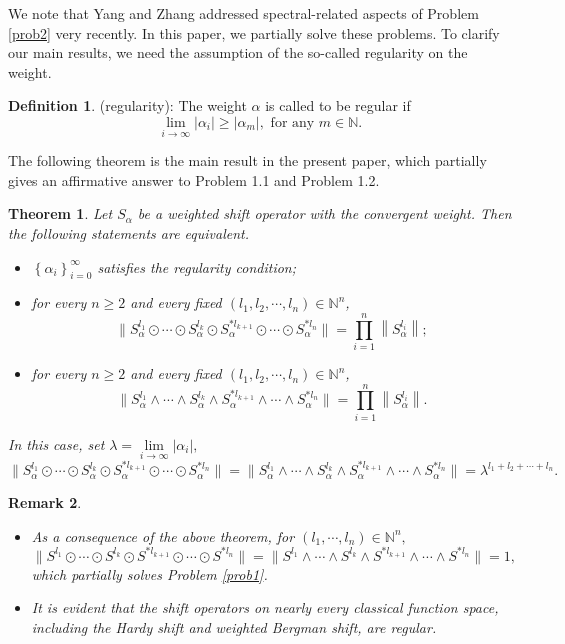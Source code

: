 \documentclass[11pt]{article}
\theoremstyle{plain}
\newtheorem{thm}{Theorem}[section]
\newtheorem{rem}[thm]{Remark}
\theoremstyle{definition}
\newtheorem{defn}{Definition}[section]
\begin{document}
We note that Yang and Zhang \cite{YZ} addressed spectral-related aspects of
Problem \ref{prob2} very recently. In this paper, we partially solve these problems. To clarify our main results, we need the assumption of the so-called regularity on the weight.

\begin{defn}\label{def:regularity}
(regularity): The weight $\alpha$ is called to be regular if 
 $$\lim\limits_{i \to \infty } \left | \alpha_{i}  \right | \ge \left | \alpha_{m}  \right |, \text{ for any } m \in \mathbb{N}. $$ 
\end{defn}
The following theorem is the main result in the present paper, which partially gives an affirmative answer to Problem 1.1 and Problem 1.2.
\begin{thm}\label{thm1.1}
 Let $S_\alpha$ be a weighted shift operator with the convergent weight. Then
 the following statements are equivalent.
\begin{itemize}
     \item[(1)] $\left \{ \alpha _{i}  \right \} _{i=0}^{\infty }$ satisfies the regularity condition;
     \item[(2)]
 for every $ n \ge 2$ and every fixed $\left ( l_{1},  l_{2},\cdots,l_{n} \right )\in \mathbb{N}^{n}$,
	$$\|S_{\alpha}^{l_1}\odot\cdots \odot S_{\alpha}^{l_k}\odot S_{\alpha}^{*l_{k+1}}\odot\cdots \odot S_{\alpha}^{*l_{n}}\|  =\mathop{\prod}_{i=1}^n\left \| S_{\alpha}^{{l_{i}}}\right\|;$$
     \item[(3)]for every $ n \ge 2$ and every fixed $\left ( l_{1},  l_{2},\cdots,l_{n} \right )\in \mathbb{N}^{n}$,
	$$\|S_{\alpha}^{l_1}\wedge\cdots \wedge S_{\alpha}^{l_k}\wedge S_{\alpha}^{*l_{k+1}}\wedge\cdots \wedge S_{\alpha}^{*l_{n}}\|=\mathop{\prod}_{i=1}^n\left \| S_{\alpha}^{{l_{i}}}\right\|.$$
\end{itemize}
In this case, set $\lambda =\lim\limits_{i \to \infty}\left | \alpha_{i}  \right |,$ $$\|S_{\alpha}^{l_1}\odot\cdots \odot S_{\alpha}^{l_k}\odot S_{\alpha}^{*l_{k+1}}\odot\cdots \odot S_{\alpha}^{*l_{n}}\|=\|S_{\alpha}^{l_1}\wedge\cdots \wedge S_{\alpha}^{l_k}\wedge S_{\alpha}^{*l_{k+1}}\wedge\cdots \wedge S_{\alpha}^{*l_{n}}\|=\lambda ^{  l_{1}  +  l_{2}  + \cdots + l_{n} }.$$
\end{thm}
\begin{rem}
\begin{itemize}
\item[1.] As a consequence of the above theorem, for $(l_1,\cdots,l_n)\in \mathbb N^n,$
$$
\|S^{l_1}\odot\cdots \odot S^{l_k}\odot S^{*l_{k+1}}\odot\cdots \odot S^{*l_{n}}\|=\|S^{l_1}\wedge\cdots \wedge S^{l_k}\wedge S^{*l_{k+1}}\wedge\cdots \wedge S^{*l_{n}}\|=1,
$$
which partially solves Problem \ref{prob1}.
\item[2.] It is evident that the shift operators on nearly every classical function space, including the Hardy shift and  weighted Bergman shift, are regular.
\end{itemize}
\end{rem}
\end{document}
